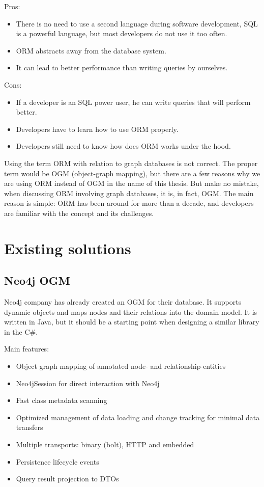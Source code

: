 \documentclass[thesis=M,english]{FITthesis}[2019/12/23]
\begin{document}
\noindent Pros:
\begin{itemize}
    \item There is no need to use a second language during software development, SQL is a powerful language, but most developers do not use it too often.
    \item ORM abstracts away from the database system.
    \item It can lead to better performance than writing queries by ourselves.
\end{itemize}
Cons:
\begin{itemize}
    \item If a developer is an SQL power user, he can write queries that will perform better.
    \item Developers have to learn how to use ORM properly.
    \item Developers still need to know how does ORM works under the hood.
\end{itemize}

Using the term ORM with relation to graph databases is not correct. The proper term would be OGM (object-graph mapping), but there are a few reasons why we are using ORM instead of OGM in the name of this thesis. But make no mistake, when discussing ORM involving graph databases, it is, in fact, OGM. The main reason is simple: ORM has been around for more than a decade, and developers are familiar with the concept and its challenges.

\section {Existing solutions}

\subsection {Neo4j OGM}

Neo4j company has already created an OGM for their database. It supports dynamic objects and maps nodes and their relations into the domain model. It is written in Java, but it should be a starting point when designing a similar library in the C\#.

\noindent Main features:
\begin{itemize}
    \item Object graph mapping of annotated node- and relationship-entities
    \item Neo4jSession for direct interaction with Neo4j
    \item Fast class metadata scanning
    \item Optimized management of data loading and change tracking for minimal data transfers
    \item Multiple transports: binary (bolt), HTTP and embedded
    \item Persistence lifecycle events
    \item Query result projection to DTOs
\end{itemize}
\end{document}
